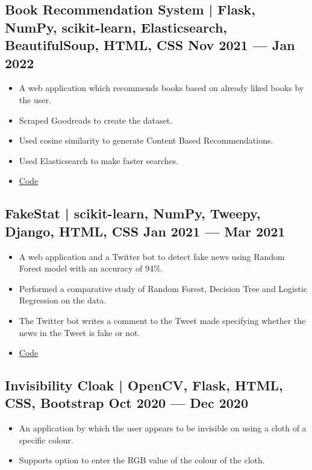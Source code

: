 \documentclass[10pt]{article}
\newenvironment{zitemize}{
\begin{itemize}\itemsep2pt \parskip0pt \parsep1pt}
{\end{itemize}\vspace{-0.7cm}}
\begin{document}
\subsection*{Book Recommendation System | \normalfont{} \normalsize Flask, NumPy, scikit-learn, Elasticsearch, BeautifulSoup, HTML, CSS  \hfill Nov 2021 --- Jan 2022
}
    \begin{zitemize}
    \item A web application which recommends books based on already liked books by the user.
     \item Scraped  Goodreads to create the dataset.
        \item Used cosine similarity to generate Content Based Recommendations.
        \item Used Elasticsearch to make faster searches.
       \item \href{https://github.com/mihikagaonkar/book-recommender-system}{Code}
    \end{zitemize}
\subsection*{FakeStat | \normalfont{} \normalsize scikit-learn, NumPy, Tweepy, Django, HTML, CSS \hfill Jan 2021 --- Mar 2021} 
    \begin{zitemize}
        \item A web application and a Twitter bot to detect fake news using Random Forest model with an accuracy of 94\%.
        \item Performed a comparative study of Random Forest, Decision Tree and Logistic Regression on the data.
        \item The Twitter bot writes a comment to the Tweet made specifying whether the news in the Tweet is fake or not.
        
        \item \href{https://github.com/mihikagaonkar/FakeStat}{Code}
    \end{zitemize}
\subsection*{Invisibility Cloak | \normalfont{} \normalsize OpenCV, Flask, HTML, CSS, Bootstrap \hfill Oct 2020 --- Dec 2020} 
    \begin{zitemize}
        \item An application by which the user appears to be invisible on using a cloth of a specific colour.
        \item Supports option to enter the RGB value of the colour of the cloth.
    \end{zitemize}
\end{document}
